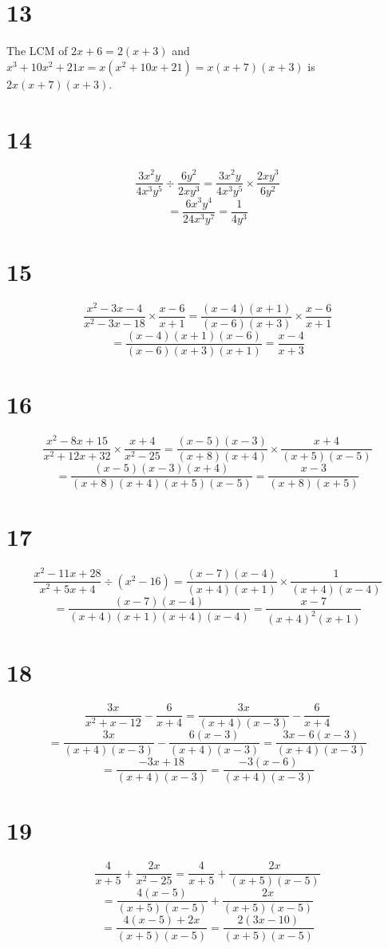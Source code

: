 \documentclass{article}
\theoremstyle{definition}
\newcommand{\?}{\stackrel{?}{=}}
\begin{document}
\section*{13}
The LCM of $2x+6=2(x+3)$ and $x^3+10x^2+21x=x(x^2+10x+21)=x(x+7)(x+3)$ is $2x(x+7)(x+3)$.

\section*{14}
\[ \dfrac{3x^2y}{4x^3y^5}\div\dfrac{6y^2}{2xy^3}=\dfrac{3x^2y}{4x^3y^5}\times\dfrac{2xy^3}{6y^2} \]
\[ =\dfrac{6x^3y^4}{24x^3y^7}=\dfrac{1}{4y^3} \]

\section*{15}
\[ \dfrac{x^2-3x-4}{x^2-3x-18}\times\dfrac{x-6}{x+1}=\dfrac{(x-4)(x+1)}{(x-6)(x+3)}\times\dfrac{x-6}{x+1} \]
\[ =\dfrac{(x-4)(x+1)(x-6)}{(x-6)(x+3)(x+1)}=\dfrac{x-4}{x+3} \]

\section*{16}
\[ \dfrac{x^2-8x+15}{x^2+12x+32}\times\dfrac{x+4}{x^2-25}=\dfrac{(x-5)(x-3)}{(x+8)(x+4)}\times\dfrac{x+4}{(x+5)(x-5)} \]
\[ =\dfrac{(x-5)(x-3)(x+4)}{(x+8)(x+4)(x+5)(x-5)}=\dfrac{x-3}{(x+8)(x+5)} \]

\section*{17}
\[ \dfrac{x^2-11x+28}{x^2+5x+4}\div(x^2-16)=\dfrac{(x-7)(x-4)}{(x+4)(x+1)}\times\frac{1}{(x+4)(x-4)} \]
\[ =\dfrac{(x-7)(x-4)}{(x+4)(x+1)(x+4)(x-4)}=\dfrac{x-7}{(x+4)^2(x+1)} \]

\section*{18}
\[ \dfrac{3x}{x^2+x-12}-\dfrac{6}{x+4}=\dfrac{3x}{(x+4)(x-3)}-\dfrac{6}{x+4} \]
\[ =\dfrac{3x}{(x+4)(x-3)}-\dfrac{6(x-3)}{(x+4)(x-3)}=\dfrac{3x-6(x-3)}{(x+4)(x-3)} \]
\[ =\dfrac{-3x+18}{(x+4)(x-3)}=\dfrac{-3(x-6)}{(x+4)(x-3)} \]

\section*{19}
\[ \dfrac{4}{x+5}+\dfrac{2x}{x^2-25}=\dfrac{4}{x+5}+\dfrac{2x}{(x+5)(x-5)} \]
\[ =\dfrac{4(x-5)}{(x+5)(x-5)}+\dfrac{2x}{(x+5)(x-5)} \]
\[ =\dfrac{4(x-5)+2x}{(x+5)(x-5)}=\dfrac{2(3x-10)}{(x+5)(x-5)} \]
\end{document}
